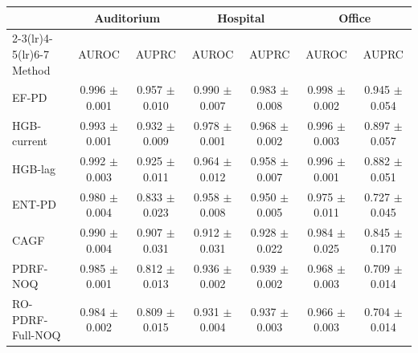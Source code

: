 \begin{tabular}{lcccccc}
\toprule
& \multicolumn{2}{c}{Auditorium} & \multicolumn{2}{c}{Hospital} & \multicolumn{2}{c}{Office} \\
\cmidrule(lr){2-3}\cmidrule(lr){4-5}\cmidrule(lr){6-7}
Method & AUROC & AUPRC & AUROC & AUPRC & AUROC & AUPRC \\
\midrule
EF-PD & 0.996 $\pm$ 0.001 & 0.957 $\pm$ 0.010 & 0.990 $\pm$ 0.007 & 0.983 $\pm$ 0.008 & 0.998 $\pm$ 0.002 & 0.945 $\pm$ 0.054 \\
HGB-current & 0.993 $\pm$ 0.001 & 0.932 $\pm$ 0.009 & 0.978 $\pm$ 0.001 & 0.968 $\pm$ 0.002 & 0.996 $\pm$ 0.003 & 0.897 $\pm$ 0.057 \\
HGB-lag & 0.992 $\pm$ 0.003 & 0.925 $\pm$ 0.011 & 0.964 $\pm$ 0.012 & 0.958 $\pm$ 0.007 & 0.996 $\pm$ 0.001 & 0.882 $\pm$ 0.051 \\
ENT-PD & 0.980 $\pm$ 0.004 & 0.833 $\pm$ 0.023 & 0.958 $\pm$ 0.008 & 0.950 $\pm$ 0.005 & 0.975 $\pm$ 0.011 & 0.727 $\pm$ 0.045 \\
CAGF & 0.990 $\pm$ 0.004 & 0.907 $\pm$ 0.031 & 0.912 $\pm$ 0.031 & 0.928 $\pm$ 0.022 & 0.984 $\pm$ 0.025 & 0.845 $\pm$ 0.170 \\
PDRF-NOQ & 0.985 $\pm$ 0.001 & 0.812 $\pm$ 0.013 & 0.936 $\pm$ 0.002 & 0.939 $\pm$ 0.002 & 0.968 $\pm$ 0.003 & 0.709 $\pm$ 0.014 \\
RO-PDRF-Full-NOQ & 0.984 $\pm$ 0.002 & 0.809 $\pm$ 0.015 & 0.931 $\pm$ 0.004 & 0.937 $\pm$ 0.003 & 0.966 $\pm$ 0.003 & 0.704 $\pm$ 0.014 \\
\bottomrule
\end{tabular}
